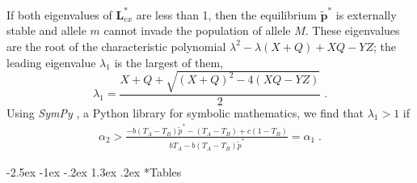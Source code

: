\documentclass[12pt]{extarticle}
\makeatletter
\renewcommand\section{\@startsection {section}{1}{\z@}%
     {-2.5ex \@plus -1ex \@minus -.2ex}%
     {1.3ex \@plus.2ex}%
    {\Large\bfseries}}
\let\vec\mathbf
\makeatother
\begin{document}
\begin{appendices}
If both eigenvalues of $\mathbf{L}^*_{ex}$ are less than 1, then the equilibrium $\vec{\tilde{p}^*}$ is externally stable and allele $m$ cannot invade the population of allele $M$. 
These eigenvalues are the root of the characteristic polynomial $\lambda^2 -\lambda (X+Q) + XQ - YZ$; the leading eigenvalue $\lambda_1$ is the largest of them,
\begin{equation} \label{eq:eigenvalues}
  \lambda_1 = \frac{X+Q + \sqrt{(X+Q)^2 - 4(XQ-YZ)}}{2} \;.
\end{equation}
Using \emph{SymPy} \citep{Meurer2017}, a Python library for symbolic mathematics, we find that $\lambda_1 > 1$ if 
\begin{equation} \label{eq:eigenvalues_greater_than_1_condition}
\begin{aligned}
 \alpha_2 > 
 \frac{-b (T_A-T_B) \tilde{p}^* - (T_A - T_B)  + c (1-T_B)}{bT_A - b (T_A-T_B) \tilde{p}^*} = %
\alpha_1 \;.
\end{aligned}
\end{equation}



\end{appendices}






\newpage

\section*{Tables}
\end{document}
